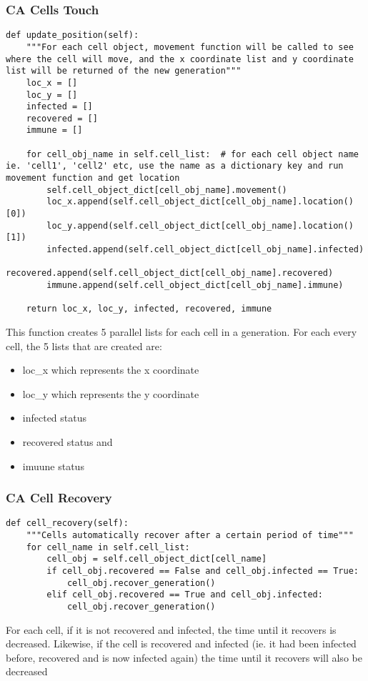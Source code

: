 \documentclass[11pt, a4paper]{article}
\begin{document}
\subsubsection{CA Cells Touch}
\begin{lstlisting}
def update_position(self):
    """For each cell object, movement function will be called to see where the cell will move, and the x coordinate list and y coordinate list will be returned of the new generation"""
    loc_x = []
    loc_y = []
    infected = []
    recovered = []
    immune = []

    for cell_obj_name in self.cell_list:  # for each cell object name ie. 'cell1', 'cell2' etc, use the name as a dictionary key and run movement function and get location
        self.cell_object_dict[cell_obj_name].movement()
        loc_x.append(self.cell_object_dict[cell_obj_name].location()[0])
        loc_y.append(self.cell_object_dict[cell_obj_name].location()[1])
        infected.append(self.cell_object_dict[cell_obj_name].infected)
        recovered.append(self.cell_object_dict[cell_obj_name].recovered)
        immune.append(self.cell_object_dict[cell_obj_name].immune)

    return loc_x, loc_y, infected, recovered, immune
\end{lstlisting}
This function creates 5 parallel lists for each cell in a generation. For each every cell, the 5 lists that are created are:
\begin{itemize}
    \item loc\_x which represents the x coordinate
    \item loc\_y which represents the y coordinate
    \item infected status
    \item recovered status and
    \item imuune status
\end{itemize}

\subsubsection{CA Cell Recovery}
\begin{lstlisting}
def cell_recovery(self):
    """Cells automatically recover after a certain period of time"""
    for cell_name in self.cell_list:
        cell_obj = self.cell_object_dict[cell_name]
        if cell_obj.recovered == False and cell_obj.infected == True:
            cell_obj.recover_generation()
        elif cell_obj.recovered == True and cell_obj.infected:
            cell_obj.recover_generation()
\end{lstlisting}
For each cell, if it is not recovered and infected, the time until it recovers is decreased. Likewise, if the cell is recovered and infected (ie. it had been infected before, recovered and is now infected again) the time until it recovers will also be decreased
\end{document}
